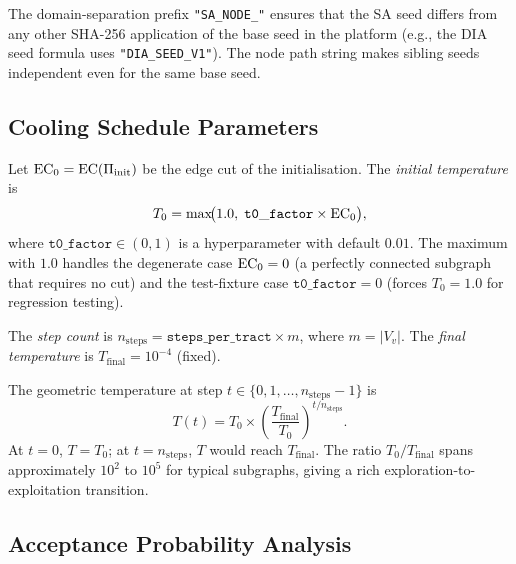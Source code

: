 The domain-separation prefix \texttt{"SA\_NODE\_"} ensures that the SA seed
differs from any other SHA-256 application of the base seed in the platform
(e.g., the DIA seed formula uses \texttt{"DIA\_SEED\_V1"}).
The node path string makes sibling seeds independent even for the same base
seed.

\subsection{Cooling Schedule Parameters}

\begin{definition}
\label{def:t0}
Let $\mathrm{EC}_0 = \mathrm{EC}(\Pi_{\mathrm{init}})$ be the edge cut of the \metis{}
initialisation.
The \emph{initial temperature} is
\[
  T_0 = \max\!\bigl(1.0,\; \mathtt{t0\_factor} \times \mathrm{EC}_0\bigr),
\]
where $\mathtt{t0\_factor} \in (0,1)$ is a hyperparameter with default $0.01$.
The maximum with $1.0$ handles the degenerate case $\mathrm{EC}_0 = 0$
(a perfectly connected subgraph that requires no cut) and the test-fixture
case $\mathtt{t0\_factor} = 0$ (forces $T_0 = 1.0$ for regression testing).
\end{definition}

\begin{definition}
\label{def:steps}
The \emph{step count} is $n_{\mathrm{steps}} = \mathtt{steps\_per\_tract} \times m$,
where $m = |V_v|$.
The \emph{final temperature} is $T_{\mathrm{final}} = 10^{-4}$ (fixed).
\end{definition}

The geometric temperature at step $t \in \{0, 1, \ldots, n_{\mathrm{steps}}-1\}$ is
\[
  T(t) = T_0 \times \left(\frac{T_{\mathrm{final}}}{T_0}\right)^{t / n_{\mathrm{steps}}}.
\]
At $t = 0$, $T = T_0$; at $t = n_{\mathrm{steps}}$, $T$ would reach $T_{\mathrm{final}}$.
The ratio $T_0 / T_{\mathrm{final}}$ spans approximately $10^2$ to $10^5$ for
typical subgraphs, giving a rich exploration-to-exploitation transition.

\subsection{Acceptance Probability Analysis}

